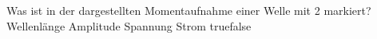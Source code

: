     {Was ist in der dargestellten Momentaufnahme einer Welle mit 2 markiert?}
    {Wellenlänge}
    {Amplitude}
    {Spannung}
    {Strom}
    {true}{false}